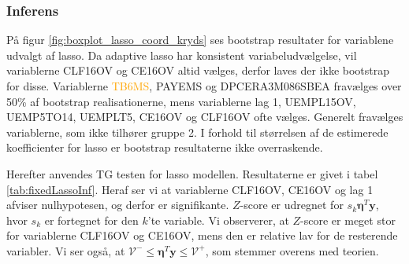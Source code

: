 \subsubsection{Inferens}
På figur \ref{fig:boxplot_lasso_coord_kryds} ses bootstrap resultater for variablene udvalgt af lasso.
Da adaptive lasso har konsistent variabeludvælgelse, vil variablerne \textcolor{blue3}{CLF16OV} og \textcolor{blue3}{CE16OV} altid vælges, derfor laves der ikke bootstrap for disse.
Variablerne \textcolor{orange}{TB6MS}, \textcolor{blue3}{PAYEMS} og \textcolor{red3}{DPCERA3M086SBEA} fravælges over 50\% af bootstrap realisationerne, mens variablerne  \textcolor{blue3}{lag 1}, \textcolor{blue3}{UEMPL15OV}, \textcolor{blue3}{UEMP5TO14}, \textcolor{blue3}{UEMPLT5}, \textcolor{blue3}{CE16OV} og \textcolor{blue3}{CLF16OV} ofte vælges.
Generelt fravælges variablerne, som ikke tilhører gruppe 2.
I forhold til størrelsen af de estimerede koefficienter for lasso er bootstrap resultaterne ikke overraskende. 

Herefter anvendes TG testen for lasso modellen.
Resultaterne er givet i tabel \ref{tab:fixedLassoInf}.
Heraf ser vi at variablerne \textcolor{blue3}{CLF16OV}, \textcolor{blue3}{CE16OV} og \textcolor{blue3}{lag 1} afviser nulhypotesen, og derfor er signifikante.
$Z$-score er udregnet for $s_k \boldsymbol{\eta}^T \textbf{y}$, hvor $s_k$ er fortegnet for den $k$'te variable. 
Vi observerer, at $Z$-score er meget stor for variablerne \textcolor{blue3}{CLF16OV} og \textcolor{blue3}{CE16OV}, mens den er relative lav for de resterende variabler. 
Vi ser også, at  $\mathcal{V^-} \leq \boldsymbol{\eta}^T \textbf{y} \leq \mathcal{V^+}$, som stemmer overens med teorien.
%

%

%
